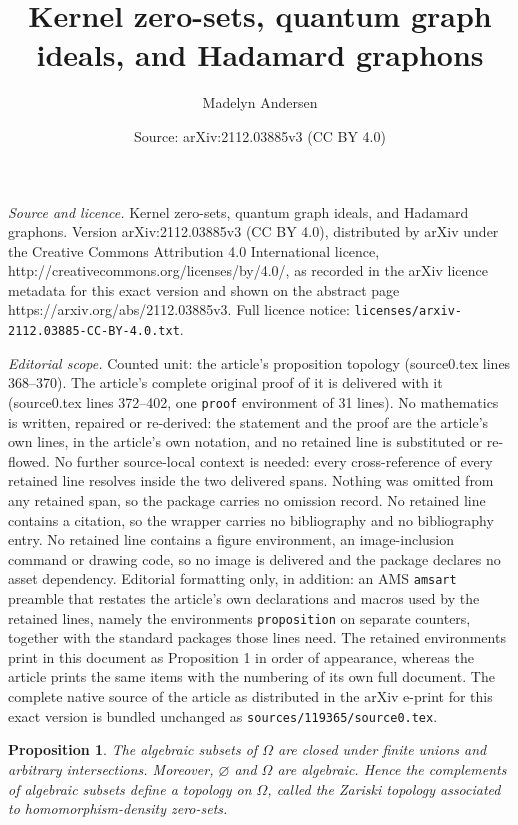 \documentclass[10pt,a4paper]{amsart}
\title{Kernel zero-sets, quantum graph ideals, and Hadamard graphons}
\author{Madelyn Andersen}
\date{Source: arXiv:2112.03885v3 (CC BY 4.0)}
\newtheorem{proposition}{Proposition}
\begin{document}
\maketitle

\noindent\emph{Source and licence.} Kernel zero-sets, quantum graph ideals, and Hadamard graphons. Version arXiv:2112.03885v3 (CC BY 4.0), distributed by arXiv under the Creative Commons Attribution 4.0 International licence, http://creativecommons.org/licenses/by/4.0/, as recorded in the arXiv licence metadata for this exact version and shown on the abstract page https://arxiv.org/abs/2112.03885v3. Full licence notice: \texttt{licenses/arxiv-2112.03885-CC-BY-4.0.txt}.\par\smallskip

\noindent\textit{Editorial scope.} Counted unit: the article's proposition topology (source0.tex lines 368--370). The article's complete original proof of it is delivered with it (source0.tex lines 372--402, one \texttt{proof} environment of 31 lines). No mathematics is written, repaired or re-derived: the statement and the proof are the article's own lines, in the article's own notation, and no retained line is substituted or re-flowed.  No further source-local context is needed: every cross-reference of every retained line resolves inside the two delivered spans.  Nothing was omitted from any retained span, so the package carries no omission record.  No retained line contains a citation, so the wrapper carries no bibliography and no bibliography entry.  No retained line contains a figure environment, an image-inclusion command or drawing code, so no image is delivered and the package declares no asset dependency.  Editorial formatting only, in addition: an AMS \texttt{amsart} preamble that restates the article's own declarations and macros used by the retained lines, namely the environments \texttt{proposition} on separate counters, together with the standard packages those lines need.  The retained environments print in this document as Proposition 1 in order of appearance, whereas the article prints the same items with the numbering of its own full document.  The complete native source of the article as distributed in the arXiv e-print for this exact version is bundled unchanged as \texttt{sources/119365/source0.tex}.
\begin{proposition}\label{proposition: zariski topology}
The algebraic subsets of $\Omega$ are closed under finite unions and arbitrary intersections. Moreover, $\varnothing$ and $\Omega$ are algebraic. Hence the complements of algebraic subsets define a topology on $\Omega$, called the Zariski topology associated to homomorphism-density zero-sets.
\end{proposition}
\end{document}
